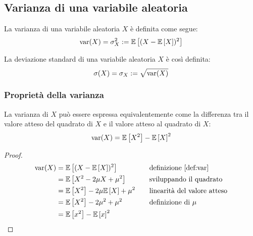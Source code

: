 \subsection{Varianza di una variabile aleatoria}
\begin{defin} \label{def:var}
	La varianza di una variabile aleatoria $X$ è definita come segue:
	\begin{equation*}
		\operatorname{var}(X) = \sigma^2_X := \mathbb{E}\left[ (X-\mathbb{E}\left[ X \right])^2 \right]
	\end{equation*}
\end{defin}

\begin{defin}
	La deviazione standard di una variabile aleatoria $X$ è così definita:
	\begin{equation*}
		\sigma(X) = \sigma_X :=\sqrt{\operatorname{var}(X)}
	\end{equation*}
\end{defin}


\subsubsection{Proprietà della varianza}
\begin{prop} \label{prop:varalt}
	La varianza di $X$ può essere espressa equivalentemente come la differenza tra il valore atteso del quadrato di $X$ e il valore atteso al quadrato di $X$:
	\begin{equation} \label{eq:varalt}
		\operatorname{var}(X) = \mathbb{E}\left[ X^2 \right]- \mathbb{E}\left[ X \right]^2
	\end{equation}
\end{prop}
\begin{proof}
	\begin{align*}
		\operatorname{var}(X) & = \mathbb{E}\left[ (X-\mathbb{E}\left[ X \right])^2 \right]          & \quad & \text{definizione \ref{def:var}}   \\
		        & = \mathbb{E}\left[ X^2-2\mu X+\mu^2 \right]      & \quad & \text{sviluppando il quadrato}     \\
		        & = \mathbb{E}\left[ X^2 \right]-2\mu \mathbb{E}\left[ X \right]+\mu^2 & \quad & \text{linearità del valore atteso} \\
		        & = \mathbb{E}\left[ X^2 \right]-2\mu^2+\mu^2      & \quad & \text{definizione di $\mu$}        \\
		        & = \mathbb{E}\left[ x^2 \right]- \mathbb{E}\left[ x \right]^2
	\end{align*}
\end{proof}

